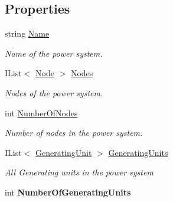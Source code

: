 \subsection*{Properties}
\begin{DoxyCompactItemize}
\item 
string \hyperlink{class_power_system_planning_1_1_power_system_ae511d3a9d7c871726037041b9fdabe14}{Name}
\begin{DoxyCompactList}\small\item\em Name of the power system. \end{DoxyCompactList}\item 
I\+List$<$ \hyperlink{class_power_system_planning_1_1_node}{Node} $>$ \hyperlink{class_power_system_planning_1_1_power_system_aa51d9c68a12cae03acd530e9ceff58f9}{Nodes}
\begin{DoxyCompactList}\small\item\em Nodes of the power system. \end{DoxyCompactList}\item 
int \hyperlink{class_power_system_planning_1_1_power_system_a3d7abefe87bb1621c5d61644b83ae3d5}{Number\+Of\+Nodes}
\begin{DoxyCompactList}\small\item\em Number of nodes in the power system. \end{DoxyCompactList}\item 
I\+List$<$ \hyperlink{class_power_system_planning_1_1_generating_unit}{Generating\+Unit} $>$ \hyperlink{class_power_system_planning_1_1_power_system_aee8ba3b28d3f43e64484359f71cb35fd}{Generating\+Units}
\begin{DoxyCompactList}\small\item\em All Generating units in the power system \end{DoxyCompactList}\item 
int {\bfseries Number\+Of\+Generating\+Units}\hypertarget{class_power_system_planning_1_1_power_system_ab4f682e8428fe860d1541b3f81a4a5d4}{}\label{class_power_system_planning_1_1_power_system_ab4f682e8428fe860d1541b3f81a4a5d4}


\end{DoxyCompactItemize}
